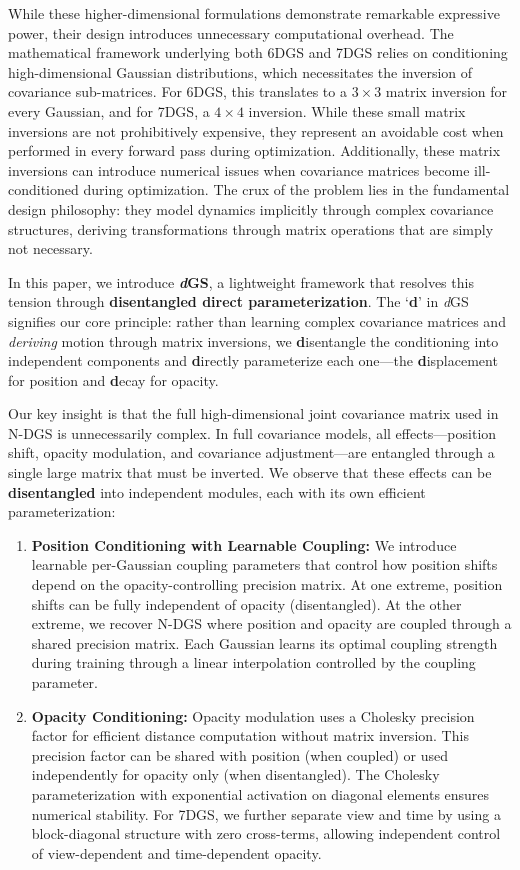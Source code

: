 \documentclass{article}
\newcommand{\modelname}{\textit{d}GS}
\begin{document}
While these higher-dimensional formulations demonstrate remarkable expressive power, their design introduces unnecessary computational overhead. The mathematical framework underlying both 6DGS and 7DGS relies on conditioning high-dimensional Gaussian distributions, which necessitates the inversion of covariance sub-matrices. For 6DGS, this translates to a $3\times3$ matrix inversion for every Gaussian, and for 7DGS, a $4\times4$ inversion. While these small matrix inversions are not prohibitively expensive, they represent an avoidable cost when performed in every forward pass during optimization. Additionally, these matrix inversions can introduce numerical issues when covariance matrices become ill-conditioned during optimization. The crux of the problem lies in the fundamental design philosophy: they model dynamics implicitly through complex covariance structures, deriving transformations through matrix operations that are simply not necessary.

In this paper, we introduce \textbf{\modelname{}}, a lightweight framework that resolves this tension through \textbf{disentangled direct parameterization}. The `\textbf{d}' in \modelname{} signifies our core principle: rather than learning complex covariance matrices and \textit{deriving} motion through matrix inversions, we \textbf{d}isentangle the conditioning into independent components and \textbf{d}irectly parameterize each one---the \textbf{d}isplacement for position and \textbf{d}ecay for opacity.

Our key insight is that the full high-dimensional joint covariance matrix used in N-DGS is unnecessarily complex. In full covariance models, all effects---position shift, opacity modulation, and covariance adjustment---are entangled through a single large matrix that must be inverted. We observe that these effects can be \textbf{disentangled} into independent modules, each with its own efficient parameterization:

\begin{enumerate}
\item \textbf{Position Conditioning with Learnable Coupling:} We introduce learnable per-Gaussian coupling parameters that control how position shifts depend on the opacity-controlling precision matrix. At one extreme, position shifts can be fully independent of opacity (disentangled). At the other extreme, we recover N-DGS where position and opacity are coupled through a shared precision matrix. Each Gaussian learns its optimal coupling strength during training through a linear interpolation controlled by the coupling parameter.

\item \textbf{Opacity Conditioning:} Opacity modulation uses a Cholesky precision factor for efficient distance computation without matrix inversion. This precision factor can be shared with position (when coupled) or used independently for opacity only (when disentangled). The Cholesky parameterization with exponential activation on diagonal elements ensures numerical stability. For 7DGS, we further separate view and time by using a block-diagonal structure with zero cross-terms, allowing independent control of view-dependent and time-dependent opacity.
\end{enumerate}
\end{document}
